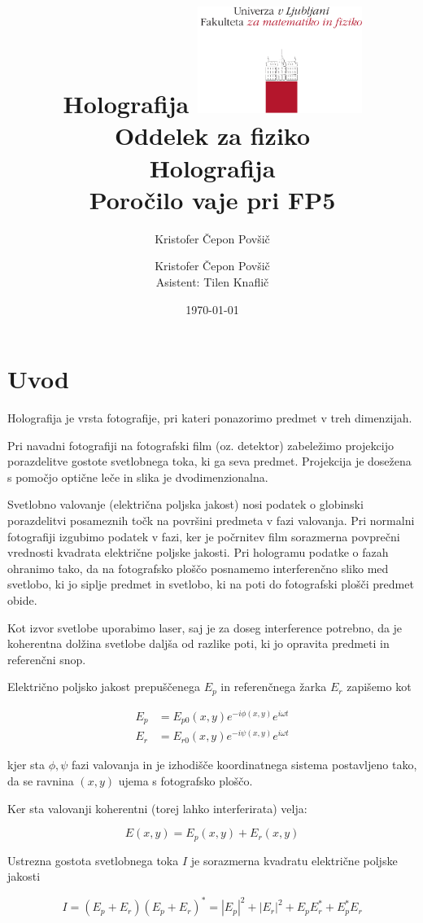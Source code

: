 \documentclass[11pt]{article}
\author{Kristofer Čepon Povšič}
\date{\today}
\title{Holografija}
\title{
  \includegraphics[width=0.4\textwidth]{fmf_logo}\\
  {\small Oddelek za fiziko} \\
  {Holografija}\\
  {\small Poročilo vaje pri FP5}\\

}
\date{}
\author{ Kristofer Čepon Povšič \\[5 cm]
  \small  Asistent: Tilen Knaflič  \\
}
\renewcommand{%
  \refname}{Viri}
\begin{document}
\maketitle
\clearpage
\tableofcontents
\clearpage

\section{Uvod}\label{sec:org072c4ed}

Holografija je vrsta fotografije, pri kateri ponazorimo predmet v treh dimenzijah.

Pri navadni fotografiji na fotografski film (oz. detektor) zabeležimo projekcijo porazdelitve gostote svetlobnega toka, ki ga seva predmet. Projekcija je dosežena s pomočjo optične leče in slika je dvodimenzionalna.

Svetlobno valovanje (električna poljska jakost) nosi podatek o globinski porazdelitvi posameznih točk na površini predmeta v fazi valovanja. Pri normalni fotografiji izgubimo podatek v fazi, ker je počrnitev film sorazmerna povprečni vrednosti kvadrata električne poljske jakosti. Pri hologramu podatke o fazah ohranimo tako, da na fotografsko ploščo posnamemo interferenčno sliko med svetlobo, ki jo siplje predmet in svetlobo, ki na poti do fotografski plošči predmet obide.

Kot izvor svetlobe uporabimo laser, saj je za doseg interference potrebno, da je koherentna dolžina svetlobe daljša od razlike poti, ki jo opravita predmeti in referenčni snop.

Električno poljsko jakost prepuščenega \(E_p\) in referenčnega žarka  \(E_r\) zapišemo kot

\begin{align*}
  E_p &= E_{p0}(x, y) e ^{- i \phi (x, y) } e ^{i \omega t} \\
  E_r &= E_{r0} (x, y) e ^{- i \psi (x, y)} e ^{i \omega t}
\end{align*}

kjer sta \(\phi, \psi\) fazi valovanja in je izhodišče koordinatnega sistema postavljeno tako, da se ravnina \((x, y)\) ujema s fotografsko ploščo.

Ker sta valovanji koherentni (torej lahko interferirata) velja:

\[ E(x, y) = E_p (x, y) + E_r (x, y)
\]

Ustrezna gostota svetlobnega toka \(I\) je sorazmerna kvadratu električne poljske jakosti

\begin{equation}\label{eq:1}
I = (E_p + E_r) (E_p + E_r)^{*} = \left| E_p \right| ^2 + \left| E_r \right| ^2 + E_p E^{*}_r + E_p^{*}E_r
\end{equation}
\end{document}
